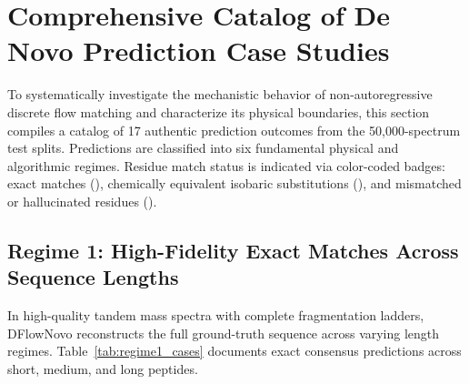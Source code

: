 \section{Comprehensive Catalog of De Novo Prediction Case Studies}

To systematically investigate the mechanistic behavior of non-autoregressive discrete flow matching and characterize its physical boundaries, this section compiles a catalog of 17 authentic prediction outcomes from the 50,000-spectrum test splits. Predictions are classified into six fundamental physical and algorithmic regimes. Residue match status is indicated via color-coded badges: exact matches (), chemically equivalent isobaric substitutions (), and mismatched or hallucinated residues ().

\subsection{Regime 1: High-Fidelity Exact Matches Across Sequence Lengths}

In high-quality tandem mass spectra with complete fragmentation ladders, DFlowNovo reconstructs the full ground-truth sequence across varying length regimes. Table~\ref{tab:regime1_cases} documents exact consensus predictions across short, medium, and long peptides.

